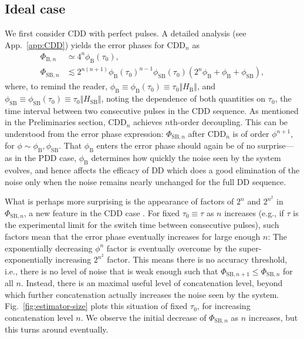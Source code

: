 \documentclass[twocolumn,pra,superscriptaddress]{revtex4-2}
\newcommand{\HB}{H_\mathrm{B}}
\newcommand{\HSB}{H_\mathrm{SB}}
\newcommand{\phiSB}{\phi_\mathrm{SB}}
\newcommand{\phiB}{\phi_\mathrm{B}}
\newcommand{\CDDn}{\mathrm{CDD}_n}
\begin{document}
\subsection{Ideal case}
We first consider CDD with perfect pulses. A detailed analysis (see App.~\ref{app:CDD}) yields the error phases for $\CDDn$ as
\begin{align}
\Phi_{\mathrm{B},n}&\simeq 4^n\phiB(\tau_0),\\
\Phi_{\mathrm{SB},n}&\lesssim 2^{n(n+1)}\phiB(\tau_0)^{n-1}\phiSB(\tau_0)(2^n\phiB+\phiB+\phiSB),\nonumber
\end{align}
where, to remind the reader, $\phiB\equiv\phiB(\tau_0)\equiv\tau_0\Vert \HB\Vert$, and $\phiSB\equiv\phiSB(\tau_0)\equiv\tau_0\Vert\HSB\Vert$, noting the dependence of both quantities on $\tau_0$, the time interval between two consecutive pulses in the CDD sequence. As mentioned in the Preliminaries section, $\CDDn$ achieves $n$th-order decoupling. This can be understood from the error phase expression: $\Phi_{\mathrm{SB},n}$ after $\CDDn$ is of order $\phi^{n+1}$, for $\phi\sim\phiB, \phiSB$. That $\phiB$ enters the error phase should again be of no surprise---as in the PDD case, $\phiB$ determines how quickly the noise seen by the system evolves, and hence affects the efficacy of DD which does a good elimination of the noise only when the noise remains nearly unchanged for the full DD sequence. 

What is perhaps more surprising is the appearance of factors of $2^n$ and $2^{n^2}$ in $\Phi_{\mathrm{SB},n}$, a new feature in the CDD case . For fixed $\tau_0\equiv \tau$ as $n$ increases (e.g., if $\tau$ is the experimental limit for the switch time between consecutive pulses), such factors mean that the error phase eventually increases for large enough $n$: The exponentially decreasing $\phi^n$ factor is eventually overcome by the super-exponentially increasing $2^{n^2}$ factor. This means there is no accuracy threshold, i.e., there is no level of noise that is weak enough such that $\Phi_{\mathrm{SB},n+1}\leq\Phi_{\mathrm{SB},n}$ for all $n$. Instead, there is an maximal useful level of concatenation level, beyond which further concatenation actually increases the noise seen by the system. Fig.~\ref{fig:estimator-size} plots this situation of fixed $\tau_0$, for increasing concatenation level $n$. We observe the initial decrease of $\Phi_{\mathrm{SB},n}$ as $n$ increases, but this turns around eventually. 
\end{document}
